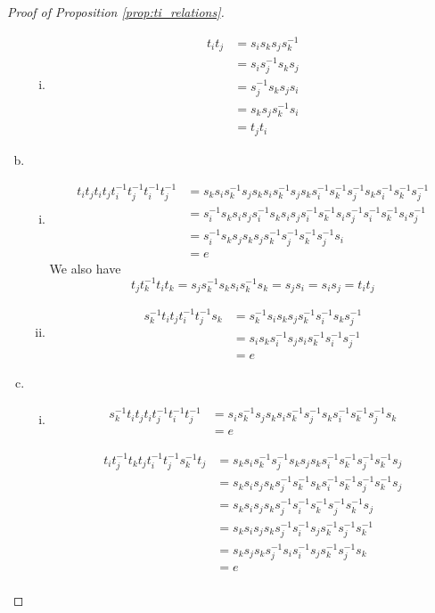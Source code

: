 \documentclass[11pt]{amsart}
\theoremstyle{definition}
\begin{document}
\begin{proof}[Proof of Proposition \ref{prop:ti_relations}]
\begin{enumerate}[a)]
\begin{enumerate}[i)]
\item
\begin{align*}
t_it_j &= s_is_ks_js_k^{-1}\\
&= s_is_j^{-1}s_ks_j\\
&= s_j^{-1}s_ks_js_i\\
&= s_ks_js_k^{-1}s_i\\
&= t_jt_i
\end{align*}
\end{enumerate}
\item
\begin{enumerate}[i)]
\item
\begin{align*}
t_it_jt_it_jt_i^{-1}t_j^{-1}t_i^{-1}t_j^{-1} &= s_ks_is_k^{-1}s_js_ks_is_k^{-1}s_js_ks_i^{-1}s_k^{-1}s_j^{-1}s_ks_i^{-1}s_k^{-1}s_j^{-1}\\
&= s_i^{-1}s_ks_is_js_i^{-1}s_ks_is_js_i^{-1}s_k^{-1}s_is_j^{-1}s_i^{-1}s_k^{-1}s_is_j^{-1}\\
&= s_i^{-1}s_ks_js_ks_js_k^{-1}s_j^{-1}s_k^{-1}s_j^{-1}s_i\\
&= e
\end{align*}
We also have
$$ t_jt_k^{-1}t_it_k = s_js_k^{-1}s_ks_is_k^{-1}s_k = s_js_i = s_is_j = t_it_j$$

\item
\begin{align*}
s_k^{-1}t_it_jt_i^{-1}t_j^{-1}s_k &= s_k^{-1}s_is_ks_js_k^{-1}s_i^{-1}s_ks_j^{-1}\\
&= s_is_ks_i^{-1}s_js_is_k^{-1}s_i^{-1}s_j^{-1}\\
&= e
\end{align*}

\end{enumerate}
\item
\begin{enumerate}[i)]
\item
\begin{align*}
s_k^{-1}t_it_jt_it_j^{-1}t_i^{-1}t_j^{-1} &= s_is_k^{-1}s_js_ks_is_k^{-1}s_j^{-1}s_ks_i^{-1}s_k^{-1}s_j^{-1}s_k\\
&= e
\end{align*}

\begin{align*}
t_it_j^{-1}t_kt_jt_i^{-1}t_j^{-1}s_k^{-1}t_j &= s_ks_is_k^{-1}s_j^{-1}s_ks_js_ks_i^{-1}s_k^{-1}s_j^{-1}s_k^{-1}s_j\\
&= s_ks_is_js_ks_j^{-1}s_k^{-1}s_ks_i^{-1}s_k^{-1}s_j^{-1}s_k^{-1}s_j\\
&= s_ks_is_js_ks_j^{-1}s_i^{-1}s_k^{-1}s_j^{-1}s_k^{-1}s_j\\
&= s_ks_is_js_ks_j^{-1}s_i^{-1}s_js_k^{-1}s_j^{-1}s_k^{-1}\\
&= s_ks_js_ks_j^{-1}s_is_i^{-1}s_js_k^{-1}s_j^{-1}s_k\\
&= e\\
\end{align*}


\end{enumerate}
\end{enumerate}
\end{proof}
\end{document}
